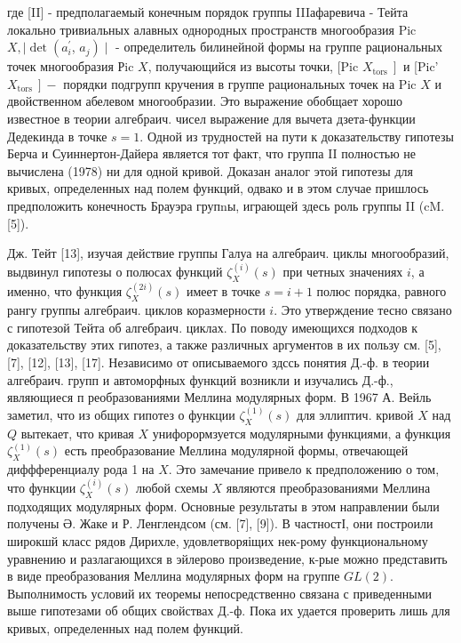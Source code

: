 \documentclass[10pt]{article}
\begin{document}
где [II] - предполагаемый конечным порядок группы IIIафаревича - Тейта локально тривиальных алавных однородных пространств многообразия Pic $X, \mid \operatorname{det}\left(a_{i}^{\prime}\right.$, $\left.a_{j}\right) \mid$ - определитель билинейной формы на группе рациональных точек многообразия Рic $X$, получающийся из высоты точки, [Pic $\left.X_{\text {tors }}\right]$ и [Pic' $\left.X_{\text {tors }}\right]-$ порядки подгрупп кручения в группе рациональных точек на Pic $X$ и двойственном абелевом многообразии. Это выражение обобщает хорошо известное в теории алгебраич. чисел выражение для вычета дзета-функции Дедекинда в точке $s=1$. Одной из трудностей на пути к доказательству гипотезы Берча и Суиннертон-Дайера является тот факт, что группа II полностью не вычислена (1978) ни для одной кривой. Доказан аналог этой гипотезы для кривых, определенных над полем функций, одвако и в этом случае пришлось предположить конечность Брауэра групnы, играющей здесь роль группы II (cM. [5]).



Дж. Тейт [13], изучая действие группы Галуа на алгебраич. циклы многообразий, выдвинул гипотезы о полюсах функций $\zeta_{X}^{(i)}(s)$ при четных значениях $i$, а именно, что функция $\zeta_{X}^{(2 i)}(s)$ имеет в точке $s=i+1$ полюс порядка, равного рангу группы алгебраич. циклов коразмерности $i$. Это утверждение тесно связано с гипотезой Тейта об алгебраич. циклах. По поводу имеющихся подходов к доказательству этих гипотез, а также различных аргументов в их пользу см. [5], [7], [12], [13], [17]. Независимо от описываемого здссь понятия Д.-ф. в теории алгебраич. групп и автоморфных функций возникли и изучались Д.-ф., являющиеся п реобразованиями Меллина модулярных форм. В 1967 А. Вейль заметил, что из общих гипотез о функции $\zeta_{X}^{(1)}(s)$ для эллиптич. кривой $X$ над $Q$ вытекает, что кривая $X$ унифорормзуется модулярными функциями, а функция $\zeta_{X}^{(1)}(s)$ есть преобразование Меллина модулярной формы, отвечающей диффференциалу рода 1 на $X$. Это замечание привело к предположению о том, что функции $\zeta_{X}^{(i)}(s)$ любой схемы $X$ являются преобразованиями Меллина подходящих модулярных форм. Основные результаты в этом направлении были получены Ә. Жаке и Р. Ленглендсом (см. [7], [9]). В частностІ, они построили широкшй класс рядов Дирихле, удовлетворяіщих нек-рому функциональному уравнению и разлагающихся в эйлерово произведение, к-рые можно представить в виде преобразования Меллина модулярных форм на группе $G L(2)$. Выполнимость условий их теоремы непосредственно связана с приведенными выше гипотезами об общих свойствах Д.-ф. Пока их удается проверить лишь для кривых, определенных над полем функций.
\end{document}
